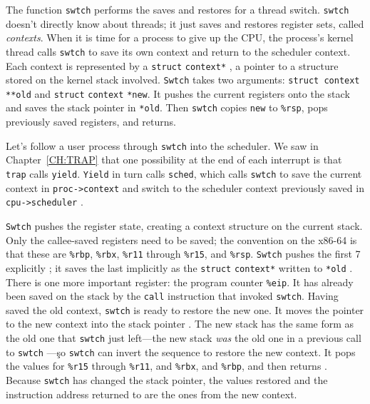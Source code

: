 The function
\lstinline{swtch}
performs the saves and restores for a thread switch.
\lstinline{swtch}
doesn't directly know about threads; it just saves and
restores register sets, called 
\textit{contexts}.
When it is time for a process to give up the CPU,
the process's kernel thread calls
\lstinline{swtch}
to save its own context and return to the scheduler context.
Each context is represented by a
\lstinline{struct}
\lstinline{context*}
,
a pointer to a structure stored on the kernel stack involved.
\lstinline{Swtch}
takes two arguments:
\lstinline{struct context}
\lstinline{**old}
and
\lstinline{struct}
\lstinline{context}
\lstinline{*new}.
It pushes the current registers onto the stack
and saves the stack pointer in
\lstinline{*old}.
Then
\lstinline{swtch}
copies
\lstinline{new}
to 
\texttt{\%rsp},
pops previously saved registers, and returns.

Let's follow a user process through
\lstinline{swtch} 
into the scheduler.
We saw in Chapter~\ref{CH:TRAP}
that one possibility at the end of each interrupt
is that 
\lstinline{trap}
calls 
\lstinline{yield}.
\lstinline{Yield}
in turn calls
\lstinline{sched},
which calls
\lstinline{swtch}
to save the current context in
\lstinline{proc->context}
and switch to the scheduler context previously saved in 
\lstinline{cpu->scheduler}
.

\lstinline{Swtch}
pushes the register state, creating a context structure
on the current stack.
Only the callee-saved registers need to be saved;
the convention on the x86-64 is that these are
\texttt{\%rbp},
\texttt{\%rbx},
\texttt{\%r11}
through
\texttt{\%r15},
and
\texttt{\%rsp}.
\lstinline{Swtch}
pushes the first 7 explicitly
;
it saves the last implicitly as the
\lstinline{struct}
\lstinline{context*}
written to
\lstinline{*old} 
.
There is one more important register:
the program counter 
\texttt{\%eip}.
It has already been saved on the stack by the
\lstinline{call}
instruction that invoked
\lstinline{swtch}.
Having saved the old context,
\lstinline{swtch}
is ready to restore the new one.
It moves the pointer to the new context
into the stack pointer
.
The new stack has the same form as the old one that
\lstinline{swtch}
just left—the new stack
\textit{was}
the old one in a previous call to
\lstinline{swtch} —\c
so 
\lstinline{swtch}
can invert the sequence to restore the new context.
It pops the values for
\texttt{\%r15}
through
\texttt{\%r11},
and
\texttt{\%rbx},
and
\texttt{\%rbp},
and then returns
.
Because 
\lstinline{swtch}
has changed the stack pointer, the values restored
and the instruction address returned to
are the ones from the new context.

